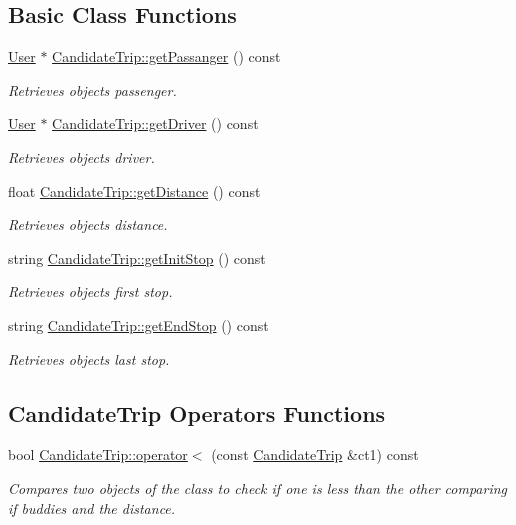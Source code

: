 \subsection*{Basic Class Functions}
\begin{DoxyCompactItemize}
\item 
\hyperlink{class_user}{User} $\ast$ \hyperlink{group___candidate_trip_gad205286835f81da2cd236be0b413cbcb}{Candidate\+Trip\+::get\+Passanger} () const
\begin{DoxyCompactList}\small\item\em Retrieves object\textquotesingle{}s passenger. \end{DoxyCompactList}\item 
\hyperlink{class_user}{User} $\ast$ \hyperlink{group___candidate_trip_ga0e97bd4bb576b9d891d69b3d4899387d}{Candidate\+Trip\+::get\+Driver} () const
\begin{DoxyCompactList}\small\item\em Retrieves object\textquotesingle{}s driver. \end{DoxyCompactList}\item 
float \hyperlink{group___candidate_trip_ga383245eac8a45bbea1ff7b6eb4b8c2bd}{Candidate\+Trip\+::get\+Distance} () const
\begin{DoxyCompactList}\small\item\em Retrieves object\textquotesingle{}s distance. \end{DoxyCompactList}\item 
string \hyperlink{group___candidate_trip_ga1fd998715e8a0c2ee6d28ab10c3fc3bf}{Candidate\+Trip\+::get\+Init\+Stop} () const
\begin{DoxyCompactList}\small\item\em Retrieves object\textquotesingle{}s first stop. \end{DoxyCompactList}\item 
string \hyperlink{group___candidate_trip_ga927733e7848429732fa14994cc837f2d}{Candidate\+Trip\+::get\+End\+Stop} () const
\begin{DoxyCompactList}\small\item\em Retrieves object\textquotesingle{}s last stop. \end{DoxyCompactList}\end{DoxyCompactItemize}
\subsection*{Candidate\+Trip Operators Functions}
\begin{DoxyCompactItemize}
\item 
bool \hyperlink{group___candidate_trip_gafa6782199d3dbf1f72509bd201516889}{Candidate\+Trip\+::operator$<$} (const \hyperlink{class_candidate_trip}{Candidate\+Trip} \&ct1) const
\begin{DoxyCompactList}\small\item\em Compares two objects of the class to check if one is less than the other comparing if buddies and the distance. \end{DoxyCompactList}\end{DoxyCompactItemize}


